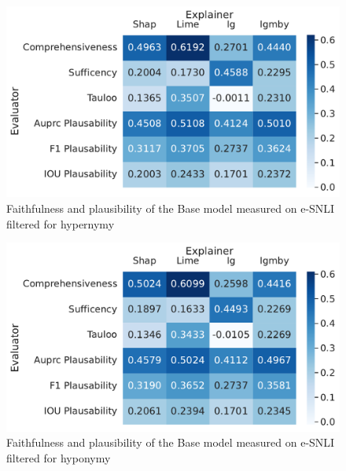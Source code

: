 \begin{figure}[h!]
    \centering
    \includegraphics[width=\textwidth]{./images/ferret_heatmaps_phenomena/default_mnli/hypernym.pdf}
    \caption{Faithfulness and plausibility of the Base model measured on \acs{e-SNLI} filtered for hypernymy}
    \label{fig:ferret-mnli-hypernym}
\end{figure}

\begin{figure}[h!]
    \centering
    \includegraphics[width=\textwidth]{./images/ferret_heatmaps_phenomena/default_mnli/hyponym.pdf}
    \caption{Faithfulness and plausibility of the Base model measured on \acs{e-SNLI} filtered for hyponymy}
    \label{fig:ferret-mnli-hyponym}
\end{figure}

